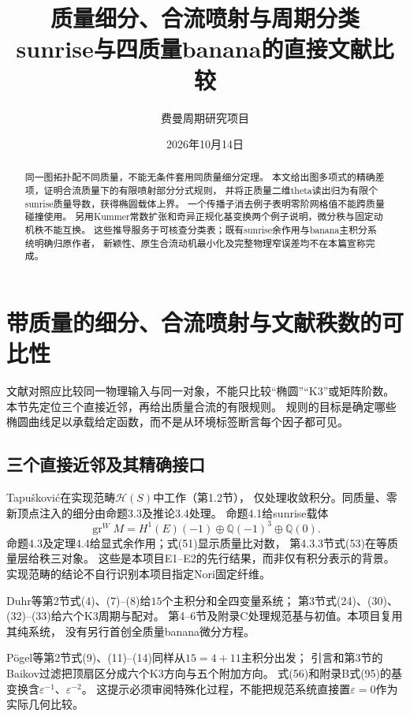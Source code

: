 \documentclass[11pt,a4paper]{ctexart}
\title{质量细分、合流喷射与周期分类\\[5pt]
\large sunrise与四质量banana的直接文献比较}
\author{费曼周期研究项目}
\date{2026年10月14日}
\theoremstyle{cnplain}\newtheorem{theorem}{定理}[section]
\theoremstyle{definition}\newtheorem{definition}[theorem]{定义}
\theoremstyle{remark}\newtheorem{remark}[theorem]{注}
\newcommand{\Q}{\mathbb Q}\newcommand{\cC}{\mathcal C}
\begin{document}
\maketitle
\begin{abstract}
同一图拓扑配不同质量，不能无条件套用同质量细分定理。
本文给出图多项式的精确差项，证明合流质量下的有限喷射部分分式规则，
并将正质量二维theta读出归为有限个sunrise质量导数，获得椭圆载体上界。
一个传播子消去例子表明零阶网格值不能跨质量碰撞使用。
另用Kummer常数扩张和奇异正规化基变换两个例子说明，微分秩与固定动机秩不能互换。
这些推导服务于可核查分类表；既有sunrise余作用与banana主积分系统明确归原作者，
新颖性、原生合流动机最小化及完整物理窄误差均不在本篇宣称完成。
\end{abstract}
\tableofcontents\bigskip
\section{带质量的细分、合流喷射与文献秩数的可比性}
\label{sec:subdivisioncomparison}

文献对照应比较同一物理输入与同一对象，不能只比较“椭圆”“K3”或矩阵阶数。
本节先定位三个直接近邻，再给出质量合流的有限规则。
规则的目标是确定哪些椭圆曲线足以承载给定函数，而不是从环境标签断言每个因子都可见。

\subsection{三个直接近邻及其精确接口}
\label{subsec:directneighbours}
Tapušković\cite{LitTap}在实现范畴$\mathcal H(S)$中工作（第1.2节），
仅处理收敛积分。同质量、零新顶点注入的细分由命题3.3及推论3.4处理。
命题4.1给sunrise载体
\[
 \operatorname{gr}^{W}M
 =H^1(E)(-1)\oplus\Q(-1)^3\oplus\Q(0).
\]
命题4.3及定理4.4给显式余作用；式(51)显示质量比对数，
第4.3.3节式(53)在等质量层给秩三对象。
这些是本项目E1--E2的先行结果，而非仅有积分表示的背景。
实现范畴的结论不自行识别本项目指定Nori固定纤维。

Duhr等\cite{LitDMPS}第2节式(4)、(7)--(8)给$15$个主积分和全四变量系统；
第3节式(24)、(30)、(32)--(33)给六个K3周期与配对。
第4--6节及附录C处理规范基与初值。本项目复用其纯系统，
没有另行首创全质量banana微分方程。

Pögel等\cite{LitPTWW}第2节式(9)、(11)--(14)同样从$15=4+11$主积分出发；
引言和第3节的Baikov过滤把顶扇区分成六个K3方向与五个附加方向。
式(56)和附录B式(95)的基变换含$\varepsilon^{-1}$、$\varepsilon^{-2}$。
这提示必须审阅特殊化过程，不能把规范系统直接置$\varepsilon=0$作为实际几何比较。
\end{document}
